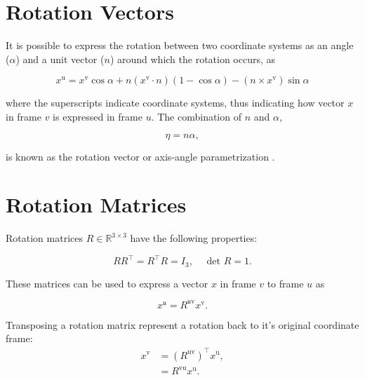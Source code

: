 
\section{Rotation Vectors}
\label{sec:rotation_vector}
It is possible to express the rotation between two coordinate systems as an angle ($\alpha$) and a unit vector ($n$) around which the rotation occurs, as

\begin{equation}
	\label{eq:rot_vec_rela}
	x^{\mathrm{u}}=x^{\mathrm{v}} \cos \alpha+n\left(x^{\mathrm{v}} \cdot n\right)(1-\cos \alpha)-\left(n\times x^{\mathrm{v}}\right) \sin \alpha
\end{equation}

where the superscripts indicate coordinate systems, thus indicating how vector $x$ in frame $v$ is expressed in frame $u$. The combination of $n$ and $\alpha$, 

\begin{equation}
	\label{eq:rotation_vector}
	\eta = n \alpha,
\end{equation}

is known as the rotation vector or axis-angle parametrization \cite{Kok2017}.



\section{Rotation Matrices}
Rotation matrices $R \in \mathbb{R}^{3 \times 3}$ have the following properties:

\begin{equation}
	\label{eq:app_rot_mat_properties}
	R R^{\top}=R^{\top} R=I_{3}, \quad \text { det } R=1.
\end{equation}

These matrices can be used to express a vector $x$ in frame $v$ to frame $u$ as 

\begin{equation}
	\label{eq:app_rot_mat_rot_x}
	x^{\mathfrak{u}}=R^{\mathfrak{u} \mathrm{v}} x^{\mathrm{v}}.
\end{equation}

Transposing a rotation matrix represent a rotation back to it's original coordinate frame:
\begin{subequations}
	\begin{align}
		\label{eq:app_rot_mat_trans}
		x^{\mathrm{v}}&=\left(R^{\mathrm{uv}}\right)^{\top} x^{\mathrm{u}},\\
		&=R^{\mathrm{vu}} x^{\mathrm{u}}.
	\end{align}
\end{subequations}

